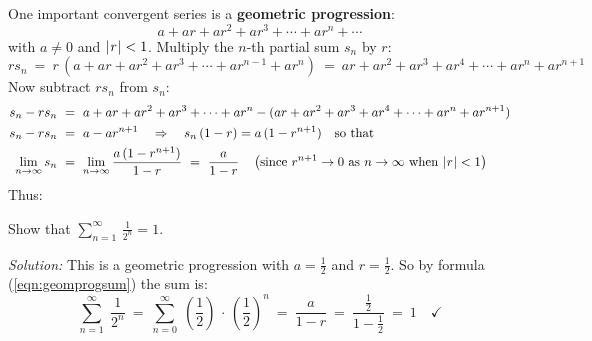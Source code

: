 
One important convergent series is a \textbf{geometric progression}:
\begin{equation}\label{eqn:geomprog}
a + ar + ar^2 + ar^3 + \cdots + ar^n + \cdots
\end{equation}
with $a \ne 0$ and $\lvert\mspace{1mu}r\mspace{1mu}\rvert < 1$. Multiply the $n$-th partial sum $s_n$ by $r$:
\[
rs_n ~=~ r\,(a + ar + ar^2 + ar^3 + \cdots + ar^{n-1} + ar^n) ~=~
ar + ar^2 + ar^3 + ar^4 + \cdots + ar^n + ar^{n+1}
\]
Now subtract $rs_n$ from $s_n$:
\begin{align*}
s_n - rs_n ~&=~ a + ar + ar^2 + ar^3 + \cdots + ar^n -
               (ar + ar^2 + ar^3 + ar^4 + \cdots + ar^n + ar^{n+1})\\
s_n - rs_n ~&=~ a - ar^{n+1} \quad\Rightarrow\quad s_n\,(1-r) = a\,(1 - r^{n+1}) \quad\text{so that}\\
\lim_{n \to \infty} s_n ~&=~ \lim_{n \to \infty} \frac{a\,(1 - r^{n+1})}{1 -r} ~=~ \frac{a}{1-r}
\quad\left(\text{since $r^{n+1} \rightarrow 0$ as $n \to \infty$ when $\lvert\mspace{1mu}r\mspace{1mu}\rvert < 1$}\right)
\end{align*}
Thus:
\newpage
\begin{exmp}\label{exmp:geomzeno}
\noindent Show that
$\displaystyle\sum_{n=1}^{\infty} \,\frac{1}{2^n} = 1$.\vspace{1mm}
\par\noindent\emph{Solution:} This is a geometric progression with
$a=\frac{1}{2}$ and $r=\frac{1}{2}$. So by formula (\ref{eqn:geomprogsum}) the
sum is:
\[
\sum_{n=1}^{\infty} \;\frac{1}{2^n} ~=~
\sum_{n=0}^{\infty} \;\left(\frac{1}{2}\right) \,\cdot\, \left(\frac{1}{2}\right)^n ~=~ \frac{a}{1-r} ~=~
\frac{\frac{1}{2}}{1 - \frac{1}{2}} ~=~ 1 \quad\checkmark
\]
\end{exmp}
